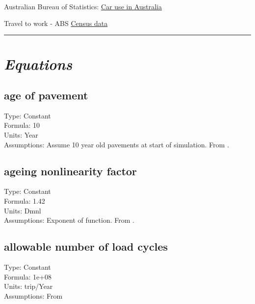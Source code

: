 \documentclass[
  11pt,
]{book}
\begin{document}
Australian Bureau of Statistics: \href{https://www.abs.gov.au/statistics/industry/tourism-and-transport/survey-motor-vehicle-use-australia/latest-release}{Car use in Australia}

Travel to work - ABS \href{https://quickstats.censusdata.abs.gov.au/census_services/getproduct/census/2016/quickstat/SSC20933}{Census data}

\begin{center}\rule{0.5\linewidth}{0.5pt}\end{center}

\hypertarget{equations-11}{%
\section{\texorpdfstring{\emph{Equations}}{Equations}}\label{equations-11}}

\hypertarget{age-of-pavement}{%
\subsection{age of pavement}\label{age-of-pavement}}

Type: Constant\\
Formula: 10\\
Units: Year\\
Assumptions: Assume 10 year old pavements at start of simulation. From \citet{fallah-fini_measuring_2015}.

\hypertarget{ageing-nonlinearity-factor}{%
\subsection{ageing nonlinearity factor}\label{ageing-nonlinearity-factor}}

Type: Constant\\
Formula: 1.42\\
Units: Dmnl\\
Assumptions: Exponent of function. From \citet{fallah-fini_measuring_2015}.

\hypertarget{allowable-number-of-load-cycles}{%
\subsection{allowable number of load cycles}\label{allowable-number-of-load-cycles}}

Type: Constant\\
Formula: 1e+08\\
Units: trip/Year\\
Assumptions: From \citet{fallah-fini_measuring_2015}
\end{document}
